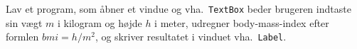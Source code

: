 Lav et program, som åbner et vindue og vha.\ \lstinline{TextBox} 
  beder brugeren indtaste sin vægt $m$ i kilogram og højde $h$ i meter, udregner
  body-mass-index efter formlen $bmi = h/m^2$, og skriver resultatet i
  vinduet vha.\  \lstinline{Label}.
